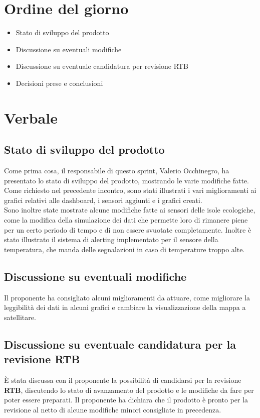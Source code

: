 \documentclass[italian,12pt]{article}
\begin{document}
\section{Ordine del giorno}
\begin{itemize}
	\item Stato di sviluppo del prodotto
	\item Discussione su eventuali modifiche
	\item Discussione su eventuale candidatura per revisione RTB
	\item Decisioni prese e conclusioni
\end{itemize}

\newpage

\section{Verbale}

\subsection{Stato di sviluppo del prodotto}
Come prima cosa, il responsabile di questo sprint, Valerio Occhinegro, ha presentato lo stato di sviluppo del prodotto,
mostrando le varie modifiche fatte. Come richiesto nel precedente incontro, sono stati illustrati i vari miglioramenti
ai grafici relativi alle dashboard, i sensori aggiunti e i grafici creati.\\
Sono inoltre state mostrate alcune modifiche fatte ai sensori delle isole ecologiche, come la modifica della
simulazione dei dati che permette loro di rimanere piene per un certo periodo di tempo e di non essere
svuotate completamente. Inoltre è stato illustrato il sistema di alerting implementato per il sensore della
temperatura, che manda delle segnalazioni in caso di temperature troppo alte.\\

\subsection{Discussione su eventuali modifiche}
Il proponente ha consigliato alcuni miglioramenti da attuare, come migliorare la leggibilità dei dati in alcuni grafici e cambiare la visualizzazione della mappa a satellitare.\\

\subsection{Discussione su eventuale candidatura per la revisione RTB}
È stata discussa con il proponente la possibilità di candidarsi per la revisione \textbf{RTB}, discutendo lo
stato di avanzamento del prodotto e le modifiche da fare per poter essere preparati. Il proponente ha
dichiara che il prodotto è pronto per la revisione al netto di alcune modifiche minori consigliate in precedenza.\\
\end{document}
